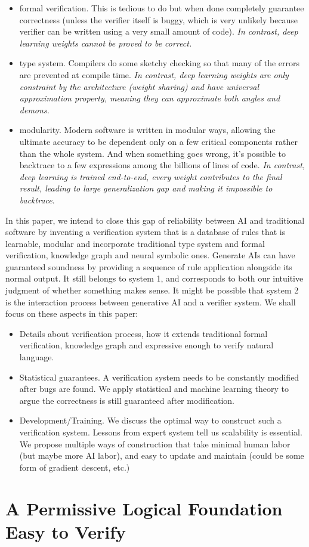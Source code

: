 \documentclass[11pt, oneside]{article}   	%
\theoremstyle{definition}
\begin{document}
\begin{itemize}
	\item formal verification. This is tedious to do but when done completely guarantee correctness (unless the verifier itself is buggy, which is very unlikely because verifier can be written using a very small amount of code). \textit{In contrast, deep learning weights cannot be proved to be correct.}
	\item type system. Compilers do some sketchy checking so that many of the errors are prevented at compile time. \textit{In contrast, deep learning weights are only constraint by the architecture (weight sharing) and have universal approximation property, meaning they can approximate both angles and demons.}
	\item modularity. Modern software is written in modular ways, allowing the ultimate accuracy to be dependent only on a few critical components rather than the whole system. And when something goes wrong, it's possible to backtrace to a few expressions among the billions of lines of code. \textit{In contrast, deep learning is trained end-to-end, every weight contributes to the final result, leading to large generalization gap and making it impossible to backtrace}.
\end{itemize}

In this paper, we intend to close this gap of reliability between AI and traditional software by inventing a verification system that is a database of rules that is learnable, modular and incorporate traditional type system and formal verification, knowledge graph and neural symbolic ones. Generate AIs can have guaranteed soundness by providing a sequence of rule application alongside its normal output. It still belongs to system 1, and corresponds to both our intuitive judgment of whether something makes sense. It might be possible that system 2 is the interaction process between generative AI and a verifier system. We shall focus on these aspects in this paper:
\begin{itemize}
	\item Details about verification process, how it extends traditional formal verification, knowledge graph and expressive enough to verify natural language.
	\item Statistical guarantees. A verification system needs to be constantly modified after bugs are found. We apply statistical and machine learning theory to argue the correctness is still guaranteed after modification.
	\item Development/Training. We discuss the optimal way to construct such a verification system. Lessons from expert system tell us scalability is essential. We propose multiple ways of construction that take minimal human labor (but maybe more AI labor), and easy to update and maintain (could be some form of gradient descent, etc.)
\end{itemize}

\section{A Permissive Logical Foundation Easy to Verify}



\section{}
\end{document}
